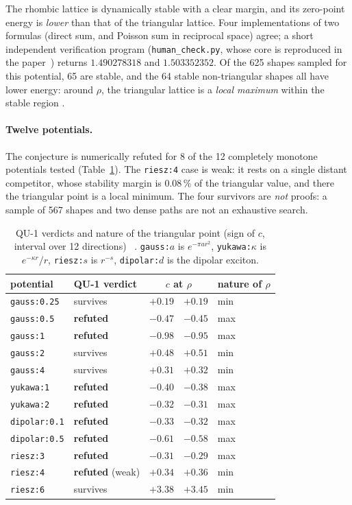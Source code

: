 \noindent The rhombic lattice is dynamically stable with a clear margin, and its zero-point energy is
\emph{lower} than that of the triangular lattice. Four implementations of two formulas (direct sum, and Poisson
sum in reciprocal space) agree; a short independent verification program
(\texttt{human\_check.py}, whose core is reproduced in the paper~\cite{ch3-p2zp}) returns $1.490278318$ and $1.503352352$. Of the 625 shapes sampled for this
potential, 65 are stable, and the 64 stable non-triangular shapes all have lower energy: around
$\rho$, the triangular lattice is a \emph{local maximum} within the stable region \tierX.

\paragraph{Twelve potentials.} The conjecture is numerically refuted for 8 of the 12 completely monotone potentials
tested (Table~\ref{ch3:tab:pot}). The \texttt{riesz:4} case is weak: it rests on a single distant competitor, whose
stability margin is 0.08\,\% of the triangular value, and there the triangular point is a local minimum. The
four survivors are \emph{not} proofs: a sample of 567 shapes and two dense paths are not an exhaustive
search.
\begin{table}[ht]\centering\small
\caption{QU-1 verdicts and nature of the triangular point (sign of $c$, interval over 12 directions) \tierX~\cite{ch3-p2zp}.
\texttt{gauss:$a$} is $e^{-\pi ar^2}$, \texttt{yukawa:$\kappa$} is $e^{-\kappa r}/r$, \texttt{riesz:$s$} is $r^{-s}$,
\texttt{dipolar:$d$} is the dipolar exciton.}\label{ch3:tab:pot}
\begin{tabular}{llr@{\,\ldots\,}ll}\toprule
potential & QU-1 verdict & \multicolumn{2}{c}{$c$ at $\rho$} & nature of $\rho$\\\midrule
\texttt{gauss:0.25} & survives & $+0.19$ & $+0.19$ & min\\
\texttt{gauss:0.5} & \textbf{refuted} & $-0.47$ & $-0.45$ & max\\
\texttt{gauss:1} & \textbf{refuted} & $-0.98$ & $-0.95$ & max\\
\texttt{gauss:2} & survives & $+0.48$ & $+0.51$ & min\\
\texttt{gauss:4} & survives & $+0.31$ & $+0.32$ & min\\
\texttt{yukawa:1} & \textbf{refuted} & $-0.40$ & $-0.38$ & max\\
\texttt{yukawa:2} & \textbf{refuted} & $-0.32$ & $-0.31$ & max\\
\texttt{dipolar:0.1} & \textbf{refuted} & $-0.33$ & $-0.32$ & max\\
\texttt{dipolar:0.5} & \textbf{refuted} & $-0.61$ & $-0.58$ & max\\
\texttt{riesz:3} & \textbf{refuted} & $-0.31$ & $-0.29$ & max\\
\texttt{riesz:4} & \textbf{refuted} (weak) & $+0.34$ & $+0.36$ & min\\
\texttt{riesz:6} & survives & $+3.38$ & $+3.45$ & min\\
\bottomrule\end{tabular}
\end{table}

